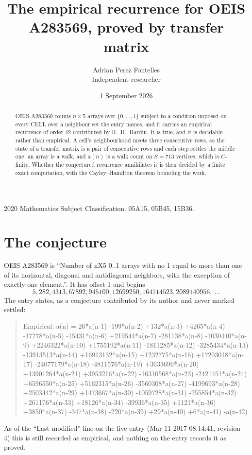 \documentclass[11pt,a4paper]{article}
\title{The empirical recurrence for OEIS A283569, proved by transfer matrix}
\author{Adrian Perez Fontelles\\ \small Independent researcher}
\date{1 September 2026}
\theoremstyle{plain}
\theoremstyle{definition}
\begin{document}
\maketitle

\begin{abstract}
OEIS A283569 counts $n\times5$ arrays over $\{0,\dots,1\}$ subject to a condition imposed on
every CELL over a neighbour set the entry names, and it carries an empirical recurrence of
order $42$ contributed by R.~H.~Hardin. It is true, and it is decidable rather than
empirical. A cell's neighbourhood meets three consecutive rows, so the state of a transfer
matrix is a pair of consecutive rows and each step settles the middle one; an array is a
walk, and $a(n)$ is a walk count on $S=713$ vertices, which is $C$-finite. Whether the
conjectured recurrence annihilates it is then decided by a finite exact computation, with the
Cayley--Hamilton theorem bounding the work.
\end{abstract}

\noindent\small 2020 Mathematics Subject Classification. 05A15, 05B45, 15B36.\normalsize

\section{The conjecture}

OEIS A283569 is ``Number of nX5 0..1 arrays with no 1 equal to more than one of its horizontal, diagonal and antidiagonal neighbors, with the exception of exactly one element.''. It has offset $1$ and begins
\[
5, 282, 4313, 67892, 945100, 12699250, 164714523, 2089140956,\ \dots
\]
The entry states, as a conjecture contributed by its author and never marked settled:
\begin{quote}
Empirical: a(n) = 26*a(n-1) -199*a(n-2) +132*a(n-3) +4265*a(n-4) -17778*a(n-5) -15431*a(n-6) +219544*a(n-7) -281138*a(n-8) -1030440*a(n-9) +2246322*a(n-10) +1755192*a(n-11) -1811285*a(n-12) -3285434*a(n-13) -13913513*a(n-14) +16913132*a(n-15) +1232775*a(n-16) +17203018*a(n-17) -24077179*a(n-18) -4811576*a(n-19) +3633696*a(n-20) +13901264*a(n-21) +3953216*a(n-22) -16310568*a(n-23) -2421451*a(n-24) +6596550*a(n-25) +5162315*a(n-26) -3560308*a(n-27) -4199693*a(n-28) +2503442*a(n-29) +1473667*a(n-30) -1059728*a(n-31) -255854*a(n-32) +261176*a(n-33) +18126*a(n-34) -39936*a(n-35) +1121*a(n-36) +3850*a(n-37) -347*a(n-38) -220*a(n-39) +29*a(n-40) +6*a(n-41) -a(n-42)
\end{quote}
As of the ``Last modified'' line on the live entry (Mar 11 2017 08:14:41, revision 4) this is still
recorded as empirical, and nothing on the entry records it as proved.
\end{document}
